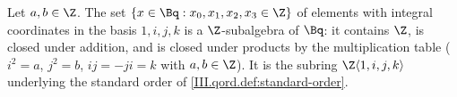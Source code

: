 Let $a,b\in\Z$. The set $\{x\in\Bq:x_0,x_1,x_2,x_3\in\Z\}$ of elements with integral coordinates in the basis $1,i,j,k$ is a $\Z$-subalgebra of $\Bq$:
it contains $\Z$, is closed under addition, and is closed under products by the multiplication table ($i^2=a$, $j^2=b$, $ij=-ji=k$ with $a,b\in\Z$).
It is the subring $\Z\langle1,i,j,k\rangle$ underlying the standard order of \cref{III.qord.def:standard-order}.
